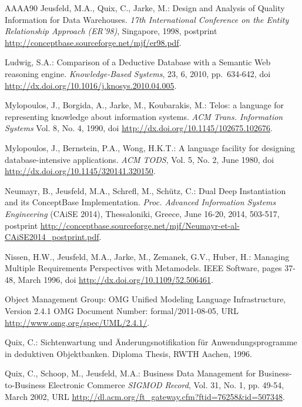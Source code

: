 \begin{thebibliography}{AAAA90}
 Jeusfeld, M.A., Quix, C., Jarke, M.:
Design and Analysis of Quality Information for Data Warehouses.
{\em 17th International Conference on the Entity Relationship Approach (ER'98)}, Singapore, 1998,
postprint \url{http://conceptbase.sourceforge.net/mjf/er98.pdf}.


 Ludwig, S.A.:
Comparison of a Deductive Database with a Semantic Web reasoning engine.
{\em Knowledge-Based Systems}, 23, 6, 2010, pp.\ 634-642,
doi \url{http://dx.doi.org/10.1016/j.knosys.2010.04.005}.


 Mylopoulos, J., Borgida, A., Jarke, M., Koubarakis, M.:
Telos: a language for representing knowledge about
information systems. {\it ACM Trans. Information Systems\/} Vol. 8, No. 4, 1990,
doi \url{http://dx.doi.org/10.1145/102675.102676}.


 Mylopoulos, J., Bernstein, P.A., Wong, H.K.T.:
A language facility for designing database-intensive applications.
{\em ACM TODS}, Vol. 5, No. 2, June 1980,
doi \url{http://dx.doi.org/10.1145/320141.320150}.


 Neumayr, B., Jeusfeld, M.A., Schrefl, M., Sch{\"u}tz, C.:
 Dual Deep Instantiation and its ConceptBase Implementation.
{\em Proc. Advanced Information Systems Engineering} (CAiSE 2014), Thessaloniki, Greece, June 16-20, 2014, 503-517,
postprint \url{http://conceptbase.sourceforge.net/mjf/Neumayr-et-al-CAiSE2014_postprint.pdf}.

 Nissen, H.W., Jeusfeld, M.A., Jarke, M., Zemanek, G.V., Huber, H.:
Managing Multiple Requirements Perspectives with Metamodels.
IEEE Software, pages 37-48, March 1996,
doi \url{http://dx.doi.org/10.1109/52.506461}.


 Object Management Group:
OMG Unified Modeling Language Infrastructure, Version 2.4.1
OMG Document Number: formal/2011-08-05,
URL \url{http://www.omg.org/spec/UML/2.4.1/}.


 Quix, C.:
Sichtenwartung und \"Anderungsnotifikation f\"ur Anwendungsprogramme in
deduktiven Objektbanken. Diploma Thesis, RWTH Aachen, 1996.

 Quix, C., Schoop, M., Jeusfeld, M.A.:
Business Data Management for Business-to-Business Electronic Commerce
{\em SIGMOD Record}, Vol. 31, No. 1, pp. 49-54, March 2002,
URL \url{http://dl.acm.org/ft_gateway.cfm?ftid=76258&id=507348}.



\end{thebibliography}
